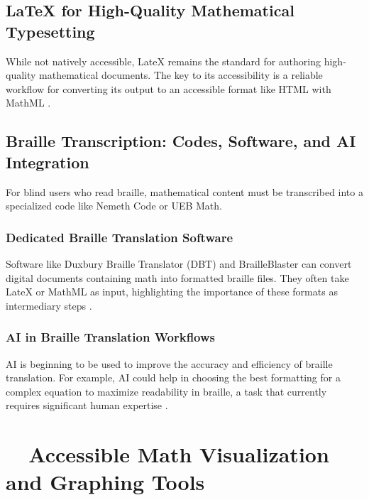 \subsection{LaTeX for High-Quality Mathematical Typesetting}\label{ch11:ssec:latex}
While not natively accessible, \gls{LateX} remains the standard for authoring high-quality mathematical documents. The key to its accessibility is a reliable workflow for converting its output to an accessible format like HTML with \gls{MathML} \supercite{LaTeXProject, LaTeXMathematics}.

\subsection{Braille Transcription: Codes, Software, and AI Integration}\label{ch11:ssec:braille}
For blind users who read braille, mathematical content must be transcribed into a specialized code like Nemeth Code or UEB Math.

\subsubsection{Dedicated Braille Translation Software}\label{ch11:sssec:braille-software}
Software like Duxbury Braille Translator (DBT) and BrailleBlaster can convert digital documents containing math into formatted braille files. They often take \gls{LateX} or \gls{MathML} as input, highlighting the importance of these formats as intermediary steps \supercite{Duxbury, BrailleBlaster}.

\subsubsection{AI in Braille Translation Workflows}\label{ch11:sssec:ai-braille}
\gls{AI} is beginning to be used to improve the accuracy and efficiency of braille translation. For example, \gls{AI} could help in choosing the best formatting for a complex equation to maximize readability in braille, a task that currently requires significant human expertise \supercite{AIBrailleTranslation, AIGenMath}.

\section{~~Accessible Math Visualization and Graphing Tools}\label{ch11:sec:visualization}
